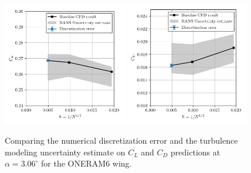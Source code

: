\begin{figure}
\center
\subfigure%
  {\includegraphics[width=0.48\textwidth]{code/image_gen/oneram6/images/CL_03aoa.png}}
\subfigure%
  {\includegraphics[width=0.48\textwidth]{code/image_gen/oneram6/images/CD_03aoa.png}}
\caption{Comparing the numerical discretization error and the turbulence modeling uncertainty estimate on $C_L$ and $C_D$ predictions at $\alpha = 3.06^\circ$ for the ONERAM6 wing.}\label{fig:oneram6_3aoa}
\end{figure}